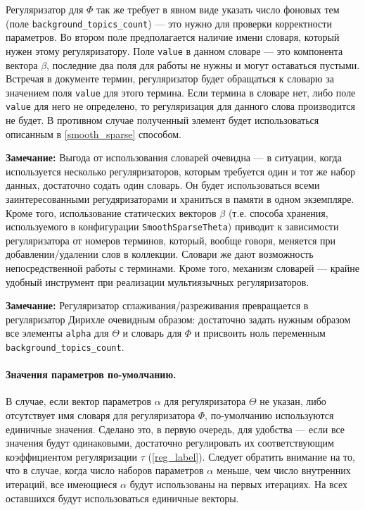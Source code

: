 Регуляризатор для $\Phi$ так же требует в явном виде указать число фоновых тем (поле \verb|background_topics_count|) --- это нужно для проверки корректности параметров. Во втором поле предполагается наличие имени словаря, который нужен этому регуляризатору. Поле \verb|value| в данном словаре --- это компонента вектора $\beta$, последние два поля для работы не нужны и могут оставаться пустыми. Встречая в документе термин, регуляризатор будет обращаться к словарю за значением поля \verb|value| для этого термина. Если термина в словаре нет, либо поле \verb|value| для него не определено, то регуляризация для данного слова производится не будет. В противном случае полученный элемент будет использоваться описанным в \ref{smooth_sparse} способом.

{\bf Замечание:} Выгода от использования словарей очевидна --- в ситуации, когда используется несколько регуляризаторов, которым требуется один и тот же набор данных, достаточно содать один словарь. Он будет использоваться всеми заинтересованными регудяризаторами и храниться в памяти в одном экземпляре. Кроме того, использование статических векторов $\beta$ (т.е. способа хранения, используемого в конфигурации \verb|SmoothSparseTheta|) приводит к зависимости регуляризатора от номеров терминов, который, вообще говоря, меняется при добавлении/удалении слов в коллекции. Словари же дают возможность непосредственной работы с терминами. Кроме того, механизм словарей --- крайне удобный инструмент при реализации мультиязычных регуляризаторов.

{\bf Замечание:} Регуляризатор сглаживания/разреживания превращается в регуляризатор Дирихле очевидным образом: достаточно задать нужным образом все элементы \verb|alpha| для $\Theta$ и словарь для $\Phi$ и присвоить ноль переменным \verb|background_topics_count|.

\paragraph{Значения параметров по-умолчанию.}\label{note}
 В случае, если вектор параметров $\alpha$ для регуляризатора $\Theta$ не указан, либо отсутствует имя словаря для регуляризатора $\Phi$, по-умолчанию используются единичные значения. Сделано это, в первую очередь, для удобства --- если все значения будут одинаковыми, достаточно регулировать их соответствующим коэффициентом регуляризации $\tau$ (\ref{reg_label}). Следует обратить внимание на то, что в случае, когда число наборов параметров $\alpha$ меньше, чем число внутренних итераций, все имеющиеся $\alpha$ будут использованы на первых итерациях. На всех оставшихся будут использоваться единичные векторы. 

